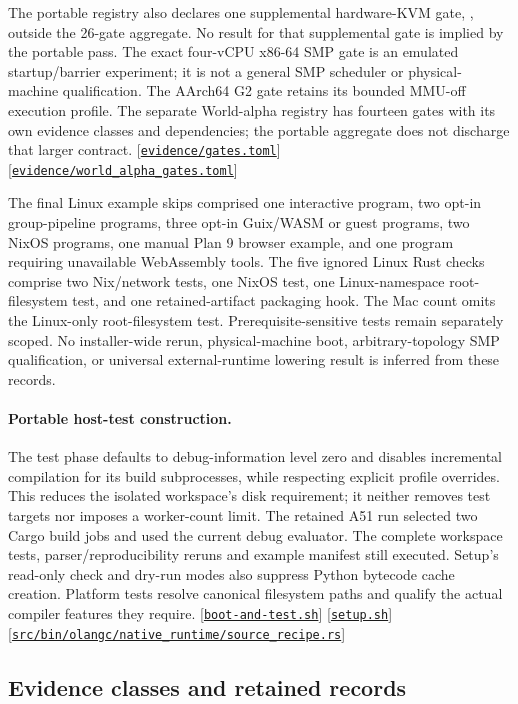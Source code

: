 \documentclass[11pt,oneside]{article}
\newcommand{\src}[1]{\textcolor{OSlate}{\scriptsize[\href{https://github.com/lostadi/OSTADIX/blob/c0b02c326b2329a95ba52447c7180bc93957cd57/#1}{\nolinkurl{#1}}]}\allowbreak}
\newcommand{\breakcode}[1]{\texttt{\seqsplit{#1}}}
\begin{document}
The portable registry also declares one supplemental hardware-KVM gate,
\breakcode{kernel-world-mode21-svm-kvm}, outside the 26-gate aggregate.
No result for that supplemental gate is implied by the portable pass.
The exact four-vCPU x86-64 SMP gate is an emulated startup/barrier experiment;
it is not a general SMP scheduler or physical-machine qualification.
The AArch64 G2 gate retains its bounded MMU-off execution profile.
The separate World-alpha registry has fourteen gates with its own evidence
classes and dependencies; the portable aggregate does not discharge that
larger contract.
\src{evidence/gates.toml}
\src{evidence/world_alpha_gates.toml}

The final Linux example skips comprised one interactive program, two
opt-in group-pipeline programs, three opt-in Guix/WASM or guest programs,
two NixOS programs, one manual Plan 9 browser example, and one program
requiring unavailable WebAssembly tools. The five ignored Linux Rust checks comprise two Nix/network tests, one
NixOS test, one Linux-namespace root-filesystem test, and one retained-artifact
packaging hook. The Mac count omits the Linux-only root-filesystem test.
Prerequisite-sensitive tests remain separately scoped. No installer-wide
rerun, physical-machine boot, arbitrary-topology SMP qualification, or
universal external-runtime lowering result is inferred from these records.

\paragraph{Portable host-test construction.}
The test phase defaults to debug-information level zero and disables
incremental compilation for its build subprocesses, while respecting explicit
profile overrides. This reduces the isolated workspace's disk requirement;
it neither removes test targets nor imposes a worker-count limit. The retained
A51 run selected two Cargo build jobs and used the current debug evaluator.
The complete workspace tests, parser/reproducibility reruns and example
manifest still executed. Setup's read-only check and dry-run modes also
suppress Python bytecode cache creation. Platform tests resolve canonical
filesystem paths and qualify the actual compiler features they require.
\src{boot-and-test.sh}
\src{setup.sh}
\src{src/bin/olangc/native_runtime/source_recipe.rs}

\subsection{Evidence classes and retained records}
\end{document}
